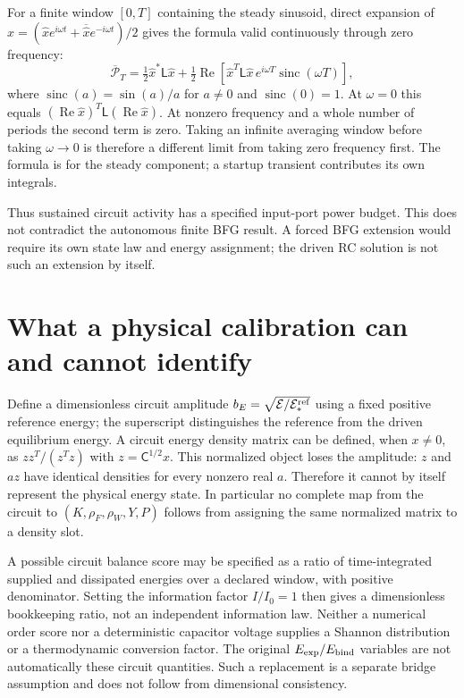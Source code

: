 \documentclass[11pt,letterpaper]{article}
\theoremstyle{definition}
\numberwithin{equation}{section}
\begin{document}
For a finite window $[0,T]$ containing the steady sinusoid, direct expansion of $x=(\widehat x e^{i\omega t}+\overline{\widehat x}e^{-i\omega t})/2$ gives the formula valid continuously through zero frequency:
\begin{equation}\label{finitewindowpower}
\overline{\mathcal P}_T=\tfrac12\widehat x^*\mathsf L\widehat x+
\tfrac12\operatorname{Re}\!\left[\widehat x^T\mathsf L\widehat x\,e^{i\omega T}\operatorname{sinc}(\omega T)\right],
\end{equation}
where $\operatorname{sinc}(a)=\sin(a)/a$ for $a\ne0$ and $\operatorname{sinc}(0)=1$. At $\omega=0$ this equals $(\operatorname{Re}\widehat x)^T\mathsf L(\operatorname{Re}\widehat x)$. At nonzero frequency and a whole number of periods the second term is zero. Taking an infinite averaging window before taking $\omega\to0$ is therefore a different limit from taking zero frequency first. The formula is for the steady component; a startup transient contributes its own integrals.

Thus sustained circuit activity has a specified input-port power budget. This does not contradict the autonomous finite BFG result. A forced BFG extension would require its own state law and energy assignment; the driven RC solution is not such an extension by itself.

\section{What a physical calibration can and cannot identify}
Define a dimensionless circuit amplitude $b_E=\sqrt{\mathcal E/\mathcal E_*^{\rm ref}}$ using a fixed positive reference energy; the superscript distinguishes the reference from the driven equilibrium energy. A circuit energy density matrix can be defined, when $x\ne0$, as $zz^T/(z^Tz)$ with $z=\mathsf C^{1/2}x$. This normalized object loses the amplitude: $z$ and $az$ have identical densities for every nonzero real $a$. Therefore it cannot by itself represent the physical energy state. In particular no complete map from the circuit to $(K,\rho_F,\rho_W,Y,P)$ follows from assigning the same normalized matrix to a density slot.

A possible circuit balance score may be specified as a ratio of time-integrated supplied and dissipated energies over a declared window, with positive denominator. Setting the information factor $I/I_0=1$ then gives a dimensionless bookkeeping ratio, not an independent information law. Neither a numerical order score nor a deterministic capacitor voltage supplies a Shannon distribution or a thermodynamic conversion factor. The original $E_{\rm exp}/E_{\rm bind}$ variables are not automatically these circuit quantities. Such a replacement is a separate bridge assumption and does not follow from dimensional consistency.
\end{document}
